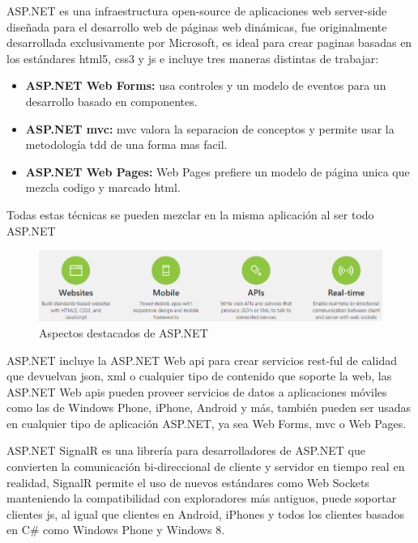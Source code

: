 ASP.NET\cite{asp.net} es una infraestructura open-source de aplicaciones web server-side diseñada para el desarrollo web de páginas web dinámicas, fue originalmente desarrollada exclusivamente por Microsoft, es ideal para crear paginas basadas en los estándares \acrshort{html}5, \acrshort{css}3 y \acrfull{js} e incluye tres maneras distintas de trabajar:

\begin{itemize}

\item \textbf{ASP.NET Web Forms:} usa controles y un modelo de eventos para un desarrollo basado en componentes.

\item \textbf{ASP.NET \acrshort{mvc}:} \acrshort{mvc} valora la separacion de conceptos y permite usar la metodología \acrshort{tdd} de una forma mas facil.

\item \textbf{ASP.NET Web Pages:} Web Pages prefiere un modelo de página unica que mezcla codigo y marcado \acrshort{html}.

\end{itemize}

Todas estas técnicas se pueden mezclar en la misma aplicación al ser todo ASP.NET

\begin{figure}[!htbp]
	\centering
	\includegraphics[scale=0.6]{fig/asp-net_highlights}
	\caption{Aspectos destacados de ASP.NET}
\end{figure}

\FloatBarrier

ASP.NET incluye la ASP.NET Web \acrshort{api} para crear servicios \acrshort{rest}-ful de calidad que devuelvan \acrshort{json}, \acrshort{xml} o cualquier tipo de contenido que soporte la web, las ASP.NET Web \acrshort{api}s pueden proveer servicios de datos a aplicaciones móviles como las de Windows Phone, iPhone, Android y más, también pueden ser usadas en cualquier tipo de aplicación ASP.NET, ya sea Web Forms, \acrshort{mvc} o Web Pages.

ASP.NET SignalR es una librería para desarrolladores de ASP.NET que convierten la comunicación bi-direccional de cliente y servidor en tiempo real en realidad, SignalR permite el uso de nuevos estándares como Web Sockets manteniendo la compatibilidad con exploradores más antiguos, puede soportar clientes \acrfull{js}, al igual que clientes en Android, iPhones y todos los clientes basados en C\# como Windows Phone y Windows 8.

